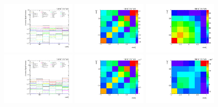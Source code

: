 \begin{figure}[htb]
\begin{center}
 \includegraphics[width=0.32\textwidth]{fig_fullRun2UL/unfolding/combined/deltaSystCombinedlog_rebinnedB_b2k.pdf}
 \includegraphics[width=0.32\textwidth]{fig_fullRun2UL/unfolding/combined/StatCovMatrix_rebinnedB_b2k.pdf}
 \includegraphics[width=0.32\textwidth]{fig_fullRun2UL/unfolding/combined/TotalSystCovMatrix_rebinnedB_b2k.pdf} \\
 \includegraphics[width=0.32\textwidth]{fig_fullRun2UL/unfolding/combined/deltaSystCombinedlogNorm_rebinnedB_b2k.pdf}
 \includegraphics[width=0.32\textwidth]{fig_fullRun2UL/unfolding/combined/StatCovMatrixNorm_rebinnedB_b2k.pdf}
 \includegraphics[width=0.32\textwidth]{fig_fullRun2UL/unfolding/combined/TotalSystCovMatrixNorm_rebinnedB_b2k.pdf} \\

\end{center}
\end{figure}
